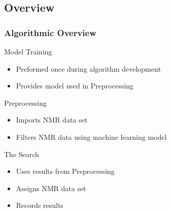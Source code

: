 \documentclass{beamer}
\begin{document}
\subsection{Overview} 
\begin{frame}
	\frametitle{Algorithmic Overview}
	\begin{block}{Model Training}
	\begin{itemize}
		\item Preformed once during algorithm development
		\item Provides model used in Preprocessing
	\end{itemize}
	\end{block}
	\begin{block}{Preprocessing}
	\begin{itemize}
		\item Imports NMR data set
		\item Filters NMR data using machine learning model
	\end{itemize}
	\end{block}
	\begin{block}{The Search}
	\begin{itemize}
		\item Uses results from Preprocessing
		\item Assigns NMR data set
		\item Records results
	\end{itemize}
	\end{block}
\end{frame}
\end{document}
